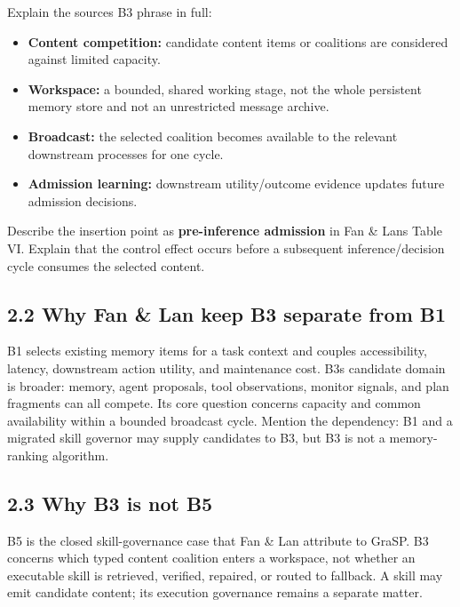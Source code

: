Explain the source\textquotesingle s B3 phrase in full:

\begin{itemize}
\tightlist
\item
  \textbf{Content competition:} candidate content items or coalitions are considered against limited capacity.
\item
  \textbf{Workspace:} a bounded, shared working stage, not the whole persistent memory store and not an unrestricted message archive.
\item
  \textbf{Broadcast:} the selected coalition becomes available to the relevant downstream processes for one cycle.
\item
  \textbf{Admission learning:} downstream utility/outcome evidence updates future admission decisions.
\end{itemize}

Describe the insertion point as \textbf{pre-inference admission} in Fan \& Lan\textquotesingle s Table VI. Explain that the control effect occurs before a subsequent inference/decision cycle consumes the selected content.

\subsection{2.2 Why Fan \& Lan keep B3 separate from B1}\label{22-why-fan--lan-keep-b3-separate-from-b1}

B1 selects existing memory items for a task context and couples accessibility, latency, downstream action utility, and maintenance cost. B3\textquotesingle s candidate domain is broader: memory, agent proposals, tool observations, monitor signals, and plan fragments can all compete. Its core question concerns capacity and common availability within a bounded broadcast cycle. Mention the dependency: B1 and a migrated skill governor may supply candidates to B3, but B3 is not a memory-ranking algorithm.

\subsection{2.3 Why B3 is not B5}\label{23-why-b3-is-not-b5}

B5 is the closed skill-governance case that Fan \& Lan attribute to GraSP. B3 concerns which typed content coalition enters a workspace, not whether an executable skill is retrieved, verified, repaired, or routed to fallback. A skill may emit candidate content; its execution governance remains a separate matter.

